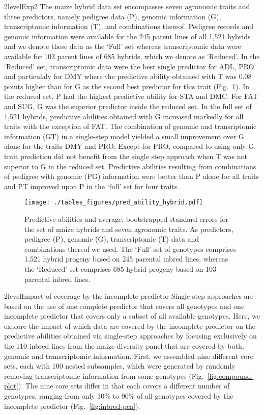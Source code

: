\documentclass[12pt,titlepage]{article}
\begin{document}
\Genetics2level{Exp2}
The maize hybrid data set encompasses seven agronomic traits and three
predictors, namely pedigree data (P), genomic information (G), transcriptomic
information (T), and combinations thereof.
Pedigree records and genomic information were available for the 245 parent 
lines of all 1,521 hybrids and we denote these data as the `Full' set whereas
transcriptomic data were available for 103 parent lines of 685 hybrids, which
we denote as `Reduced'.
In the `Reduced' set, transcriptomic data were the best single predictor for
ADL, PRO and particulaly for DMY where the predictive ability obtained with T
was 0.08 points higher than for G as the second best predictor for this trait
(Fig.~\ref{fig:HybridResults}).
In the reduced set, P had the highest predictive ability for STA and DMC\@.
For FAT and SUG, G was the superior predictor inside the reduced set.
In the full set of 1,521 hybrids, predictive abilities obtained with G increased
markedly for all traits with the exception of FAT\@.
The combination of genomic and transriptomic information (GT) in a single-step
model yielded a small improvement over G alone for the traits DMY and PRO\@.
Except for PRO, compared to using only G, trait prediction did not benefit from 
the single step approach when T was not superior to G in the reduced set.
Predictive abilities resulting from combinations of pedigree with genomic (PG)
information were better than P alone for all traits and PT improved upon P in
the `full' set for four traits.

\begin{figure}[H]
\centering
  \texttt{[image: ./tables\_figures/pred\_ability\_hybrid.pdf]}
  \caption{
    Predictive abilities and average, bootstrapped standard errors for the set
    of maize hybrids and seven agronomic traits.
    As predictors, pedigree (P), genomic (G), transcriptomic (T) data and 
    combinations thereof we used.
    The `Full' set of genotypes comprises 1,521 hybrid progeny based on 245
    parental inbred lines, whereas the `Reduced' set comprises 685 hybrid
    progeny based on 103 parental inbred lines.
  }
\label{fig:HybridResults}
\end{figure}





\Genetics2level{Impact of coverage by the incomplete predictor}
Single-step approaches are based on the use of one complete predictor that
covers all genotypes and one incomplete predictor that covers only a subset of
all available genotypes.
Here, we explore the impact of which data are covered by the incomplete 
predictor on the predictive abilities obtained via single-step approaches by
focusing exclusively on the 110 inbred lines from the maize diversity panel
that are covered by both, genomic and transcriptomic information.
First, we assembled nine different core sets, each with 100 nested subsamples,
which were generated by randomly removing transcriptomic information from
some genotypes (Fig.~\ref{fig:compound-plot}).
The nine core sets differ in that each covers a different number of genotypes,
ranging from only 10\% to 90\% of all genotypes covered by the incomplete
predictor (Fig.~\ref{fig:inbred-pca}).
\end{document}
